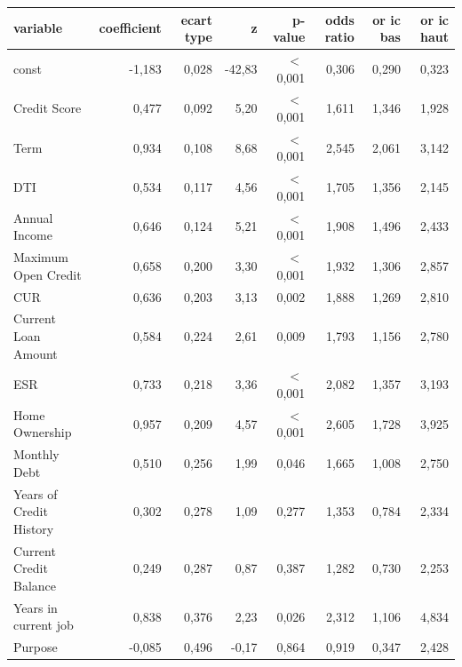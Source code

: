 \begin{tabular}{lrrrrrrr}
\toprule
\textbf{variable} & \textbf{coefficient} & \textbf{ecart type} & \textbf{z} & \textbf{p-value} & \textbf{odds ratio} & \textbf{or ic bas} & \textbf{or ic haut} \\
\midrule
const & -1,183 & 0,028 & -42,83 & $<$\,0,001 & 0,306 & 0,290 & 0,323 \\
Credit Score & 0,477 & 0,092 & 5,20 & $<$\,0,001 & 1,611 & 1,346 & 1,928 \\
Term & 0,934 & 0,108 & 8,68 & $<$\,0,001 & 2,545 & 2,061 & 3,142 \\
DTI & 0,534 & 0,117 & 4,56 & $<$\,0,001 & 1,705 & 1,356 & 2,145 \\
Annual Income & 0,646 & 0,124 & 5,21 & $<$\,0,001 & 1,908 & 1,496 & 2,433 \\
Maximum Open Credit & 0,658 & 0,200 & 3,30 & $<$\,0,001 & 1,932 & 1,306 & 2,857 \\
CUR & 0,636 & 0,203 & 3,13 & 0,002 & 1,888 & 1,269 & 2,810 \\
Current Loan Amount & 0,584 & 0,224 & 2,61 & 0,009 & 1,793 & 1,156 & 2,780 \\
ESR & 0,733 & 0,218 & 3,36 & $<$\,0,001 & 2,082 & 1,357 & 3,193 \\
Home Ownership & 0,957 & 0,209 & 4,57 & $<$\,0,001 & 2,605 & 1,728 & 3,925 \\
Monthly Debt & 0,510 & 0,256 & 1,99 & 0,046 & 1,665 & 1,008 & 2,750 \\
Years of Credit History & 0,302 & 0,278 & 1,09 & 0,277 & 1,353 & 0,784 & 2,334 \\
Current Credit Balance & 0,249 & 0,287 & 0,87 & 0,387 & 1,282 & 0,730 & 2,253 \\
Years in current job & 0,838 & 0,376 & 2,23 & 0,026 & 2,312 & 1,106 & 4,834 \\
Purpose & -0,085 & 0,496 & -0,17 & 0,864 & 0,919 & 0,347 & 2,428 \\
\bottomrule
\end{tabular}
